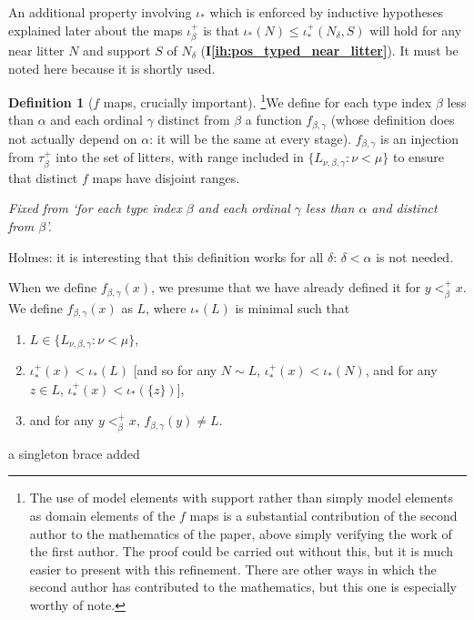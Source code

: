 \documentclass[112pt]{article}
\theoremstyle{definition}
\newtheorem{definition}[theorem]{Definition}
\theoremstyle{remark}
\newcommand{\ihref}[1]{(\textbf{I\ref{#1}})}
\newcommand{\hsuggest}[1]{{\color{magenta}#1}}
\newenvironment{annot}{\begin{center}\color{blue}\sl}{\end{center}}
\begin{document}
An additional property involving $\iota_*$ which is enforced by inductive hypotheses explained later about the maps $\iota_\beta^+$ is that $\iota_*(N) \leq \iota_*^+(N_\delta,S)$ will hold for any near litter $N$ and support $S$ of $N_\delta$ \ihref{ih:pos_typed_near_litter}.  It must be noted here because it is shortly used.

\begin{definition}[$f$ maps, crucially important]\footnote{The use of model elements with support rather than simply model elements as domain elements of the $f$ maps is a substantial contribution of the second author to the mathematics of the paper, above simply verifying the work of the first author.  The proof could be carried out without this, but it is much easier to present with this refinement.  There are other ways in which the second author has contributed to the mathematics, but this one is especially worthy of note.}\label{def:f_map}
We define for each type index $\beta$ less than $\alpha$ and each ordinal $\gamma$ distinct from $\beta$ a function $f_{\beta,\gamma}$ (whose definition does not actually depend on $\alpha$:  it will be the same at every stage).  $f_{\beta,\gamma}$ is an injection from $\tau_\beta^+$ into the set of litters, with range included in  $\{L_{\nu,\beta,\gamma}:\nu < \mu\}$ to ensure that distinct $f$ maps have disjoint ranges.

\begin{annot}
  Fixed from `for each type index $\beta$ and each ordinal $\gamma$ less than $\alpha$ and distinct from $\beta$'.

Holmes:  it is interesting that this definition works for all $\delta$:  $\delta<\alpha$ is not needed.
\end{annot}


When we define $f_{\beta,\gamma}(x)$, we presume that we have already defined it for $y <^+_\beta x$.
We define $f_{\beta,\gamma}(x)$ as $L$, where $\iota_*(L)$ is minimal such that

\begin{enumerate}
\item $L \in  \{L_{\nu,\beta,\gamma}:\nu < \mu\}$,

\item  $\iota^+_*(x) <\iota_*(L)$ [and so for any $N \sim L$, $\iota^+_*(x) <\iota_*(N)$, and for any $z \in L$, $\iota^+_*(x) < \iota_*(\{z\})$],

\item and for any $y<_\beta^+ x$, $f_{\beta,\gamma}(y) \neq L$.

\end{enumerate}

\hsuggest{a singleton brace added}
\end{definition}
\end{document}
